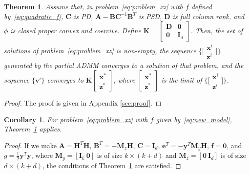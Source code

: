 \documentclass[10pt,twocolumn,twoside]{IEEEtran}
\newcommand{\Hm}{\mathbf{H}} %
\newcommand{\y}{\mathbf{y}} %
\newcommand{\x}{\mathbf{x}} %
\newcommand{\z}{\mathbf{z}} %
\newcommand{\vs}{\mathbf{v}} %
\newcommand{\D}{\mathbf{D}} %
\newcommand{\A}{\mathbf{A}} %
\newcommand{\B}{\mathbf{B}} %
\newcommand{\C}{\mathbf{C}} %
\newcommand{\e}{\mathbf{e}} %
\newcommand{\f}{\mathbf{f}} %
\newcommand{\M}{\mathbf{M}} %
\newcommand{\I}{\mathbf{I}} %
\newcommand{\K}{\mathbf{K}} %
\newtheorem{theorem}{Theorem}
\newtheorem{corollary}{Corollary}
\begin{document}
\begin{theorem} \label{th:main}
	Assume that, in problem~\eqref{eq:problem_xz} with $f$ defined by~\eqref{eq:quadratic_f}, $\C$ is PD, $\A - \B \C^{-1} \B^T$ is PSD, $\D$ is full column rank, and $\phi$ is closed proper convex and coercive. Define $\K = \left[\begin{smallmatrix} \D & \mathbf{0} \\ \mathbf{0} & \I_{d} \end{smallmatrix} \right]$. Then, the set of solutions of problem~\eqref{eq:problem_xz} is non-empty, the sequence $\big\{\big[\begin{smallmatrix} \x^i \\ \z^i \end{smallmatrix}\big]\big\}$ generated by the partial ADMM converges to a solution of that problem, and the sequence $\{\vs^i\}$ converges to $\K \left[\begin{smallmatrix} \x^* \\ \z^* \end{smallmatrix}\right]$, where $\left[\begin{smallmatrix} \x^* \\ \z^* \end{smallmatrix}\right]$ is the limit of $\big\{\big[\begin{smallmatrix} \x^i \\ \z^i \end{smallmatrix}\big]\big\}$.
\end{theorem}

\begin{proof}
The proof is given in Appendix \ref{sec:proof}.
\end{proof}

\begin{corollary} \label{th:corollary}
	For problem~\eqref{eq:problem_xz} with $f$ given by~\eqref{eq:new_model}, Theorem~\ref{th:main} applies. 
\end{corollary}

\begin{proof}
	If we make $\A = \Hm^T \Hm$, $\B^T = - \M_z \Hm$, $\C = \I_d$, $\e^T = - \y^T \M_y \Hm$, $\f = \mathbf{0}$, and $g = \frac{1}{2} \y^T \y$, where $\M_y = [\I_k~\mathbf 0]$ is of size $k \times (k+d)$ and $\M_z = [\mathbf 0~\I_d]$ is of size $d \times (k+d)$, the conditions of Theorem~\ref{th:main} are satisfied.
\end{proof}
	
\end{document}

